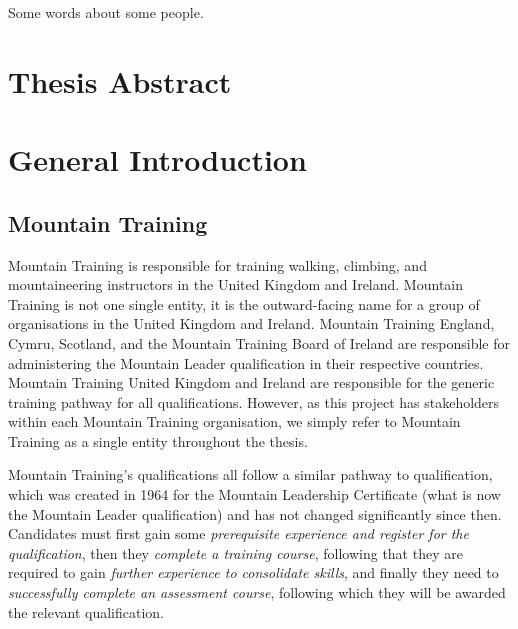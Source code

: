 \documentclass[
  12pt,
  a4paper,
]{book}
\begin{document}
Some words about some people.

{
\setcounter{tocdepth}{2}
\tableofcontents
}
\listoftables
{}

\listoffigures
{}

\mainmatter
\setcounter{page}{1}

\hypertarget{thesis-abstract}{%
\chapter*{Thesis Abstract}\label{thesis-abstract}}

\hypertarget{gen-intro}{%
\chapter{General Introduction}\label{gen-intro}}

\hypertarget{mountain-training}{%
\section{Mountain Training}\label{mountain-training}}

Mountain Training is responsible for training walking, climbing, and mountaineering instructors in the United Kingdom and Ireland. Mountain Training is not one single entity, it is the outward-facing name for a group of organisations in the United Kingdom and Ireland. Mountain Training England, Cymru, Scotland, and the Mountain Training Board of Ireland are responsible for administering the Mountain Leader qualification in their respective countries. Mountain Training United Kingdom and Ireland are responsible for the generic training pathway for all qualifications. However, as this project has stakeholders within each Mountain Training organisation, we simply refer to Mountain Training as a single entity throughout the thesis.

Mountain Training's qualifications all follow a similar pathway to qualification, which was created in 1964 for the Mountain Leadership Certificate (what is now the Mountain Leader qualification) and has not changed significantly since then. Candidates must first gain some \emph{prerequisite experience and register for the qualification}, then they \emph{complete a training course}, following that they are required to gain \emph{further experience to consolidate skills}, and finally they need to \emph{successfully complete an assessment course}, following which they will be awarded the relevant qualification.
\end{document}
